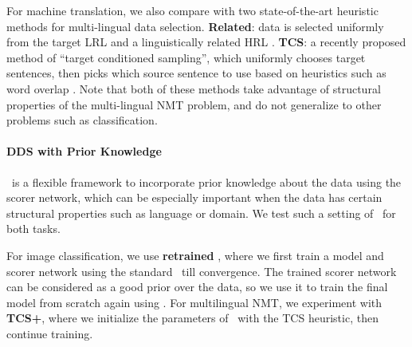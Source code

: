 For machine translation, we also compare with two state-of-the-art heuristic methods for multi-lingual data selection. \textbf{Related}: data is selected uniformly from the target LRL and a linguistically related HRL \citep{rapid_adapt_nmt}. \textbf{TCS}: a recently proposed method of ``target conditioned sampling'', which uniformly chooses target sentences, then picks which source sentence to use based on heuristics such as word overlap \citep{TCS}. Note that both of these methods take advantage of structural properties of the multi-lingual NMT problem, and do not generalize to other problems such as classification. 

\paragraph{DDS with Prior Knowledge} \dds~is a flexible framework to incorporate prior knowledge about the data using the scorer network, which can be especially important when the data has certain structural properties such as language or domain. We test such a setting of \dds~for both tasks.

For image classification, we use \textbf{retrained \dds}, where we first train a model and scorer network using the standard \dds~till convergence. The trained scorer network can be considered as a good prior over the data, so we use it to train the final model from scratch again using \dds. For multilingual NMT, we experiment with \textbf{TCS+\dds}, where we initialize the parameters of \dds~with the TCS heuristic, then continue training. 



